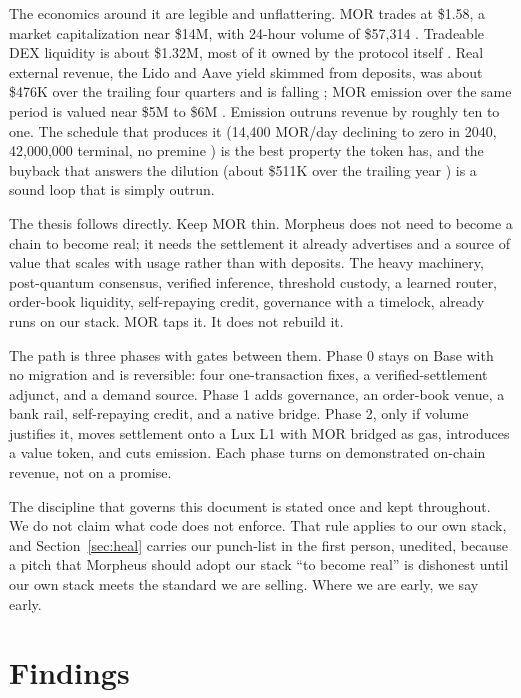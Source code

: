 \documentclass[11pt,a4paper]{article}
\newcommand{\prov}[1]{{\color{muted}\footnotesize\sffamily[#1]}}
\begin{document}
The economics around it are legible and unflattering. MOR trades at \$1.58, a market
capitalization near \$14M, with 24-hour volume of \$57,314 \prov{verified}. Tradeable DEX
liquidity is about \$1.32M, most of it owned by the protocol itself \prov{verified}. Real
external revenue, the Lido and Aave yield skimmed from deposits, was about \$476K over the
trailing four quarters and is falling \prov{verified}; MOR emission over the same period is
valued near \$5M to \$6M \prov{verified}. Emission outruns revenue by roughly ten to one. The
schedule that produces it (14,400 MOR/day declining to zero in 2040, 42,000,000 terminal, no
premine \prov{verified}) is the best property the token has, and the buyback that answers the
dilution (about \$511K over the trailing year \prov{verified}) is a sound loop that is simply
outrun.

The thesis follows directly. Keep MOR thin. Morpheus does not need to become a chain to become
real; it needs the settlement it already advertises and a source of value that scales with
usage rather than with deposits. The heavy machinery, post-quantum consensus, verified
inference, threshold custody, a learned router, order-book liquidity, self-repaying credit,
governance with a timelock, already runs on our stack. MOR taps it. It does not rebuild it.

The path is three phases with gates between them. Phase 0 stays on Base with no migration and
is reversible: four one-transaction fixes, a verified-settlement adjunct, and a demand source.
Phase 1 adds governance, an order-book venue, a bank rail, self-repaying credit, and a native
bridge. Phase 2, only if volume justifies it, moves settlement onto a Lux L1 with MOR bridged
as gas, introduces a value token, and cuts emission. Each phase turns on demonstrated on-chain
revenue, not on a promise.

The discipline that governs this document is stated once and kept throughout. We do not claim
what code does not enforce. That rule applies to our own stack, and Section~\ref{sec:heal}
carries our punch-list in the first person, unedited, because a pitch that Morpheus should
adopt our stack ``to become real'' is dishonest until our own stack meets the standard we are
selling. Where we are early, we say early.

\section{Findings}
\label{sec:findings}
\end{document}
